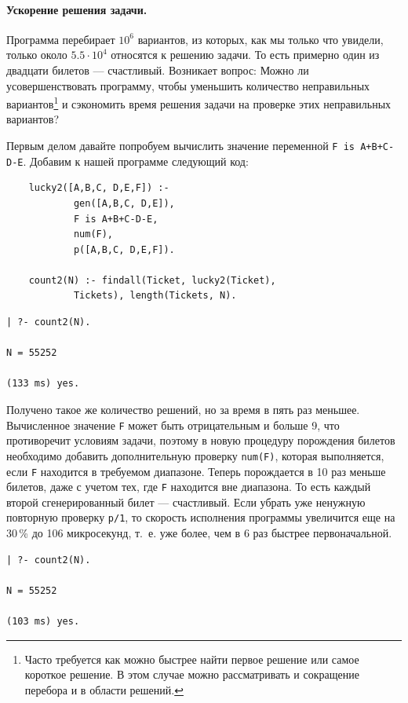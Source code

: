 \documentclass[12pt, openany, twoside]{book} %
\begin{document}
\paragraph{Ускорение решения задачи.} Программа перебирает $10^6$ вариантов, из которых, как мы только что увидели, только около $5.5\cdot 10^4$ относятся к решению задачи. То есть примерно один из двадцати билетов --- счастливый. Возникает вопрос: Можно ли усовершенствовать программу, чтобы уменьшить количество неправильных вариантов\footnote{Часто требуется как можно быстрее найти первое решение или самое короткое решение. В этом случае можно рассматривать и сокращение перебора и в области решений.} и сэкономить время решения задачи на проверке этих неправильных вариантов?

Первым делом давайте попробуем вычислить значение переменной \texttt{F is A+B+C-D-E}. Добавим к нашей программе следующий код:
{\tt\begin{verbatim}
    lucky2([A,B,C, D,E,F]) :-
            gen([A,B,C, D,E]),
            F is A+B+C-D-E,
            num(F),
            p([A,B,C, D,E,F]).

    count2(N) :- findall(Ticket, lucky2(Ticket),
            Tickets), length(Tickets, N).
\end{verbatim}}
{\tt\begin{verbatim}
| ?- count2(N).

N = 55252

(133 ms) yes.
\end{verbatim}}

\noindent{}Получено такое же количество решений, но за время в пять раз меньшее. Вычисленное значение \texttt{F} может быть отрицательным и больше 9, что противоречит условиям задачи, поэтому в новую процедуру порождения билетов необходимо добавить дополнительную проверку \texttt{num(F)}, которая выполняется, если \texttt{F} находится в требуемом диапазоне. Теперь порождается в 10 раз меньше билетов, даже с учетом тех, где \texttt{F} находится вне диапазона. То есть каждый второй сгенерированный билет --- счастливый.  Если убрать уже ненужную повторную проверку \texttt{p/1}, то скорость исполнения программы увеличится еще на 30\,{}\% до 106 микросекунд, т.~е. уже более, чем в 6 раз быстрее первоначальной.
{\tt\begin{verbatim}
| ?- count2(N).

N = 55252

(103 ms) yes.
\end{verbatim}}
\end{document}
